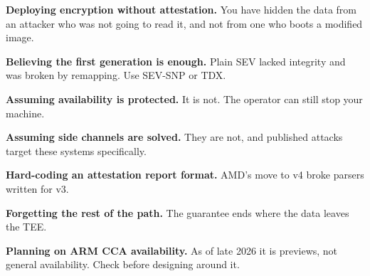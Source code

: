 \begin{pitfall}
\begin{tight}
  \item \textbf{Deploying encryption without attestation.} You have hidden the
        data from an attacker who was not going to read it, and not from one
        who boots a modified image.
  \item \textbf{Believing the first generation is enough.} Plain SEV lacked
        integrity and was broken by remapping. Use SEV-SNP or TDX.
  \item \textbf{Assuming availability is protected.} It is not. The operator
        can still stop your machine.
  \item \textbf{Assuming side channels are solved.} They are not, and published
        attacks target these systems specifically.
  \item \textbf{Hard-coding an attestation report format.} AMD's move to v4
        broke parsers written for v3.
  \item \textbf{Forgetting the rest of the path.} The guarantee ends where the
        data leaves the TEE.
  \item \textbf{Planning on ARM CCA availability.} As of late 2026 it is
        previews, not general availability. Check before designing around it.
\end{tight}
\end{pitfall}

